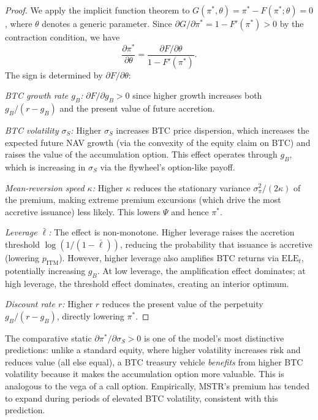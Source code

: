 \begin{proof}
We apply the implicit function theorem to $G(\pi^*, \theta) =
\pi^* - F(\pi^*; \theta) = 0$, where $\theta$ denotes a generic parameter.
Since $\partial G / \partial \pi^* = 1 - F'(\pi^*) > 0$ by the contraction
condition, we have
\begin{equation}\label{eq:ift}
  \frac{\partial \pi^*}{\partial \theta}
  = \frac{\partial F / \partial \theta}{1 - F'(\pi^*)}.
\end{equation}
The sign is determined by $\partial F / \partial \theta$:

\emph{BTC growth rate $g_B$:} $\partial F / \partial g_B > 0$ since
higher growth increases both $g_B/(r-g_B)$ and the present value of future
accretion.

\emph{BTC volatility $\sigma_S$:} Higher $\sigma_S$ increases BTC price
dispersion, which increases the expected future NAV growth (via the convexity
of the equity claim on BTC) and raises the value of the accumulation option.
This effect operates through $g_B$, which is increasing in $\sigma_S$ via
the flywheel's option-like payoff.

\emph{Mean-reversion speed $\kappa$:} Higher $\kappa$ reduces the
stationary variance $\sigma_\pi^2/(2\kappa)$ of the premium, making extreme
premium excursions (which drive the most accretive issuance) less likely.
This lowers $\Psi$ and hence $\pi^*$.

\emph{Leverage $\bar\ell$:} The effect is non-monotone.  Higher leverage
raises the accretion threshold $\log(1/(1-\bar\ell))$, reducing the
probability that issuance is accretive (lowering $p_{\mathrm{ITM}}$).
However, higher leverage also amplifies BTC returns via $\mathrm{ELE}_t$,
potentially increasing $g_B$.  At low leverage, the amplification effect
dominates; at high leverage, the threshold effect dominates, creating an
interior optimum.

\emph{Discount rate $r$:} Higher $r$ reduces the present value of the
perpetuity $g_B/(r-g_B)$, directly lowering $\pi^*$.
\end{proof}

\begin{remark}\label{rem:vol_value}
The comparative static $\partial\pi^*/\partial\sigma_S > 0$ is one of the
model's most distinctive predictions: unlike a standard equity, where higher
volatility increases risk and reduces value (all else equal), a BTC treasury
vehicle \emph{benefits} from higher BTC volatility because it makes the
accumulation option more valuable.  This is analogous to the vega of a call
option.  Empirically, MSTR's premium has tended to expand during periods of
elevated BTC volatility, consistent with this prediction.
\end{remark}

